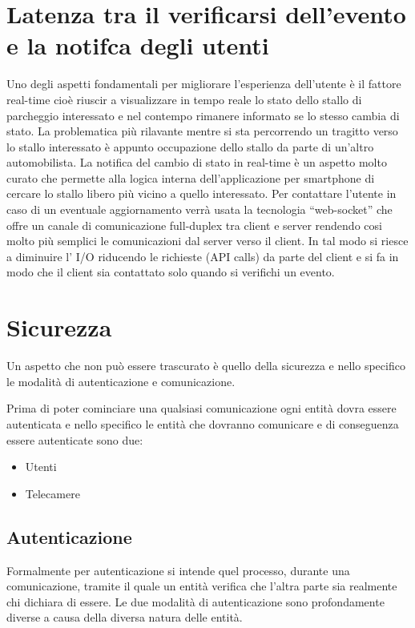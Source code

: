 \section*{Latenza tra il verificarsi dell'evento e la notifca degli utenti}
Uno degli aspetti fondamentali per migliorare l'esperienza dell'utente è il fattore real-time cioè riuscir a visualizzare in tempo reale lo stato dello stallo di parcheggio interessato e nel contempo rimanere informato se lo stesso cambia di stato. La problematica più rilavante mentre si sta percorrendo un tragitto verso lo stallo interessato è appunto occupazione dello stallo da parte di un'altro automobilista. La notifica del cambio di stato in real-time è un aspetto molto curato che permette alla logica interna dell'applicazione per smartphone di cercare lo stallo libero più vicino a quello interessato. Per contattare l'utente  in caso di un eventuale aggiornamento verrà usata la tecnologia ``web-socket'' che offre un canale di comunicazione full-duplex tra client e server rendendo cosi molto più semplici le comunicazioni dal server verso il client. 
In tal modo si riesce a diminuire l' I/O riducendo le richieste (API calls) da parte del client e si fa in modo che il client sia contattato solo quando si verifichi un evento. 

\section*{Sicurezza}
Un aspetto che non può essere trascurato è quello della sicurezza e nello specifico le modalità di autenticazione e comunicazione.


Prima di poter cominciare una qualsiasi comunicazione ogni entità dovra essere autenticata e nello specifico le entità che dovranno comunicare e di conseguenza essere autenticate sono due:

\begin{itemize}
	\item Utenti
	\item Telecamere
\end{itemize}

\subsection*{Autenticazione} 
Formalmente per autenticazione si intende quel processo, durante una comunicazione, tramite il quale un entità verifica che l'altra parte sia realmente chi dichiara di essere.
Le due modalità di autenticazione sono profondamente diverse a causa della diversa natura delle entità. 

